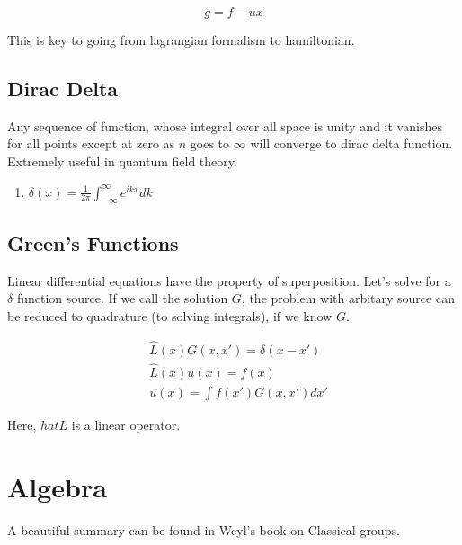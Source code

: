 \documentclass{report}
\begin{document}
$$g = f - ux$$

\noindent This is key to going from lagrangian formalism to hamiltonian.

\section{Dirac Delta}
Any sequence of function, whose integral over all space is unity and it vanishes for all points except at zero as $n$ goes to $\infty$ will converge to dirac delta function. Extremely useful in quantum field theory.

\begin{enumerate}
  \item $\delta(x) = \frac{1}{2\pi}\int_{-\infty}^{\infty} e^{ikx} dk $
\end{enumerate}

\section{Green's Functions}

Linear differential equations have the property of superposition. Let's solve for a $\delta$ function source. If we call the solution $G$, the problem with arbitary source can be reduced to quadrature (to solving integrals), if we know $G$.

\begin{align}
  &\hat{L}(x)G(x,x') = \delta(x-x')\\
  &\hat{L}(x)u(x) = f(x)\\\nonumber
  &u(x) = \int{f(x')G(x,x')}dx'
\end{align}

Here, $hat{L}$ is a linear operator.

\chapter{Algebra}

A beautiful summary can be found in Weyl's book on Classical groups.
\end{document}
